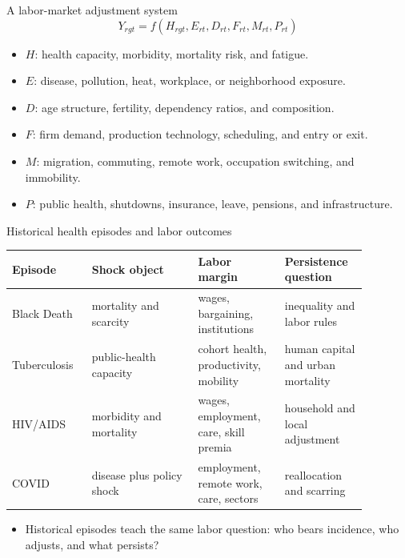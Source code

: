 \documentclass[aspectratio=169,11pt]{beamer}
\begin{document}
\begin{frame}{A labor-market adjustment system}
\small
\[
Y_{rgt}=f(H_{rgt},E_{rt},D_{rt},F_{rt},M_{rt},P_{rt})
\]
\begin{itemize}
    \item $H$: health capacity, morbidity, mortality risk, and fatigue.
    \item $E$: disease, pollution, heat, workplace, or neighborhood exposure.
    \item $D$: age structure, fertility, dependency ratios, and composition.
    \item $F$: firm demand, production technology, scheduling, and entry or exit.
    \item $M$: migration, commuting, remote work, occupation switching, and immobility.
    \item $P$: public health, shutdowns, insurance, leave, pensions, and infrastructure.
\end{itemize}
\end{frame}

\begin{frame}{Historical health episodes and labor outcomes}
\small
\begin{tabular}{p{0.19\linewidth} p{0.27\linewidth} p{0.22\linewidth} p{0.20\linewidth}}
\toprule
Episode & Shock object & Labor margin & Persistence question \\
\midrule
Black Death & mortality and scarcity & wages, bargaining, institutions & inequality and labor rules \\
Tuberculosis & public-health capacity & cohort health, productivity, mobility & human capital and urban mortality \\
HIV/AIDS & morbidity and mortality & wages, employment, care, skill premia & household and local adjustment \\
COVID & disease plus policy shock & employment, remote work, care, sectors & reallocation and scarring \\
\bottomrule
\end{tabular}
\vspace{0.3cm}
\begin{itemize}
    \item Historical episodes teach the same labor question: who bears incidence, who adjusts, and what persists?
\end{itemize}
\end{frame}
\end{document}
